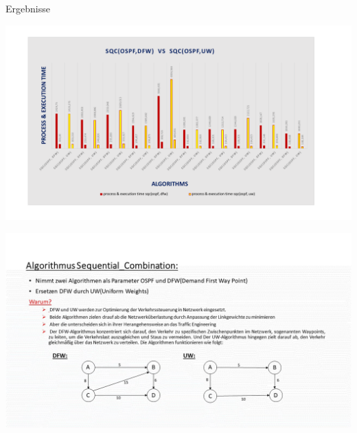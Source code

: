\documentclass[aspectratio=169,10pt]{beamer}
\begin{document}
\begin{frame}{Ergebnisse}
\begin{center}
    \includegraphics[width=\textwidth]{images/naveed_14.pdf}
\end{center}
\end{frame}
\begin{frame}[fragile]{}
\begin{center}
    \includegraphics[width=\textwidth]{images/naveed_7.jpg}
\end{center}
\end{frame}


\end{document}
